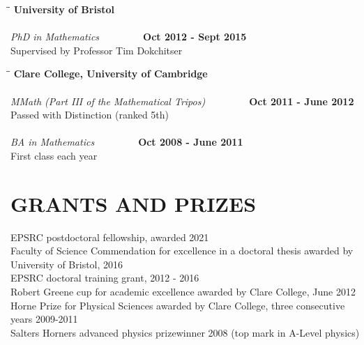 \documentclass{res}
\begin{document}
\begin{resume}
\bigskip

\vspace{-0.1in}	
   \begin{tabbing}
   \hspace{2in}\= \hspace{2in}\= \kill %
    {\bf University of Bristol}\\
 ~\\
      {\it PhD in Mathematics} \>~\> ~~~~~~ {\bf Oct 2012 - Sept 2015} \\       
    Supervised by Professor Tim Dokchitser      
  \end{tabbing}\vspace{-17pt}      %
     \begin{tabbing}
   \hspace{2in}\= \hspace{2in}\= \kill %
    {\bf Clare College, University of Cambridge}\\
~\\
      {\it MMath (Part III of the Mathematical Tripos) } \>~\> ~~~~~~ {\bf Oct 2011 - June 2012}\\       
    Passed with Distinction (ranked 5th) \\   
~\\
      {\it BA in Mathematics } \>~\> ~~~~~~ {\bf Oct 2008 - June 2011} \\       
    First class each year   \\   
\end{tabbing}\vspace{-25pt}   



\section{GRANTS AND PRIZES} 
\bigskip 
EPSRC postdoctoral fellowship, awarded 2021 \medskip \\
    Faculty of Science Commendation for excellence in a doctoral thesis awarded by University of Bristol, 2016 \medskip \\
    EPSRC doctoral training grant, 2012 - 2016 \medskip \\         
    Robert Greene cup for academic excellence awarded by Clare College, June 2012 \medskip \\
Horne Prize for Physical Sciences awarded by Clare College, three consecutive years 2009-2011 \medskip \\
Salters Horners advanced physics prizewinner 2008 (top mark in A-Level physics)      


\end{resume}
\end{document}
